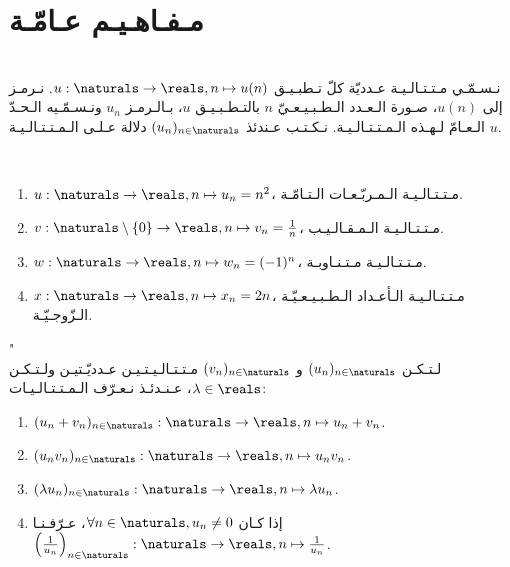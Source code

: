 \section{مـفـاهـيـم عـامّـة}%
\label{sec:sesequences:general-concepts}

\begin{definition}[الـمـتـتـالـيـة]%
    \label{def:sequences:sequence}
    \ \\%
    نـسـمّـي مـتـتـالـيـة عـدديّة كلّ تـطبـيـق
    \(u:\naturals \to \reals, n \mapsto u(n)\).
    نـرمـز إلى \(u(n)\)، صـورة الـعـدد الـطـبـيـعـيّ \(n\)
    بالتـطـبـيـق \(u\)، بـالـرمـز \(u_n\)
    ونـسـمّـيه الـحـدّ الـعـامّ لـهـذه الـمـتـتـالـيـة.
    نـكـتـب عـندئذ \((u_n)_{n \in \naturals}\)
    دلالة عـلـى الـمـتـتـالـيـة \(u\).
\end{definition}

\begin{example}\ \\%
    \begin{enumerate}%
        \item \(u:\naturals \to \reals, n \mapsto u_n = n^2\)،
              مـتـتـالـيـة الـمـربّـعـات الـتـامّـة.
        \item \(v:\naturals \setminus \{0\} \to \reals, n \mapsto v_n = \frac{1}{n}\)،
              مـتـتـالـيـة الـمـقـالـيـب.
        \item \(w:\naturals \to \reals, n \mapsto w_n = (-1)^n\)،
              مـتـتـالـيـة مـتـنـاوبـة.
        \item \(x:\naturals \to \reals, n \mapsto x_n = 2n\)،
              مـتـتـالـيـة الـأعـداد الـطـبـيـعـيّـة الـزّوجـيّـة.
    \end{enumerate}
\end{example}

\begin{definition}"
    \label{def:sequences:operations}
    \ \\%
    لـتـكـن \((u_n)_{n \in \naturals}\) و \((v_n)_{n \in \naturals}\) مـتـتـالـيـتـيـن عـدديّـتيـن
    ولـتـكـن \(\lambda \in \reals\)،
    عـنـدئـذ نـعـرّف الـمـتـتـالـيـات:
    \begin{enumerate}
        \item \((u_n + v_n)_{n \in \naturals}: \naturals \to \reals, n \mapsto u_n + v_n\).
        \item \((u_n v_n)_{n \in \naturals}: \naturals \to \reals, n \mapsto u_n v_n\).
        \item \((\lambda u_n)_{n \in \naturals}: \naturals \to \reals, n \mapsto \lambda u_n\).
        \item إذا كـان \(\forall n \in \naturals, u_n \neq 0\)، عـرّفـنـا
              \(\left(\frac{1}{u_{n}}\right)_{n\in\naturals}: \naturals \to \reals, n \mapsto \frac{1}{u_n}\).
    \end{enumerate}
\end{definition}

